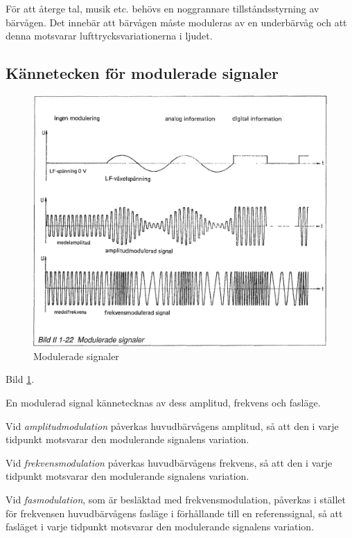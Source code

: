 För att återge tal, musik etc. behövs en noggrannare tillståndsstyrning av
bärvågen. Det innebär att bärvågen måste moduleras av en underbärvåg och att
denna motsvarar lufttrycksvariationerna i ljudet.

\subsection{Kännetecken för modulerade signaler}

\begin{figure}
\includegraphics[width=\textwidth]{images/bild_2_1-22}
\caption{Modulerade signaler}
\label{fig:BildII1-22}
\end{figure}

Bild \ref{fig:BildII1-22}.

En modulerad signal kännetecknas av dess amplitud, frekvens och fasläge.

Vid \emph{amplitudmodulation} påverkas huvudbärvågens amplitud, så att den i
varje tidpunkt motsvarar den modulerande signalens variation.

Vid \emph{frekvensmodulation} påverkas huvudbärvågens frekvens, så att den i
varje tidpunkt motsvarar den modulerande signalens variation.

Vid \emph{fasmodulation}, som är besläktad med frekvensmodulation, påverkas i
stället för frekvensen huvudbärvågens fasläge i förhållande till en
referenssignal, så att fasläget i varje tidpunkt motsvarar den modulerande
signalens variation.

